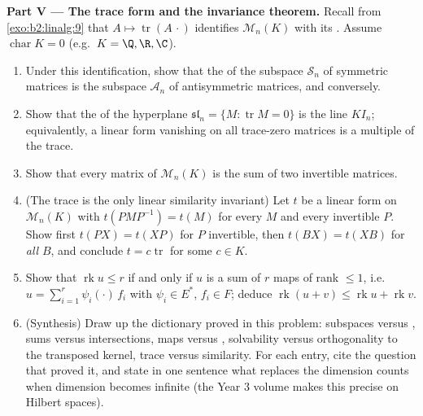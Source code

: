 \begin{problem}
\medskip
\noindent\textbf{Part V --- The trace form and the invariance
theorem.} Recall from \cref{exo:b2:linalg:9} that $A \mapsto
\operatorname{tr}(A\,\cdot)$ identifies $\mathcal{M}_n(K)$ with
its . Assume $\operatorname{char} K = 0$ (e.g.\ $K = \Q, \R,
\C$).
\begin{enumerate}[resume]
  \item Under this identification, show that the  of
        the subspace $\mathcal{S}_n$ of symmetric matrices is the
        subspace $\mathcal{A}_n$ of antisymmetric matrices, and
        conversely.
  \item Show that the  of the hyperplane
        $\mathfrak{sl}_n = \{M : \operatorname{tr} M = 0\}$ is
        the line $K I_n$; equivalently, a linear form vanishing
        on all trace-zero matrices is a multiple of the trace.
  \item Show that every matrix of $\mathcal{M}_n(K)$ is the sum
        of two invertible matrices.
  \item (The trace is the only linear similarity invariant) Let
        $t$ be a linear form on $\mathcal{M}_n(K)$ with
        $t(PMP^{-1}) = t(M)$ for every $M$ and every invertible
        $P$. Show first $t(PX) = t(XP)$ for $P$ invertible, then
        $t(BX) = t(XB)$ for \emph{all} $B$, and conclude $t = c
        \operatorname{tr}$ for some $c \in K$.
  \item Show that $\operatorname{rk} u \leq r$ if and only if $u$
        is a sum of $r$ maps of rank $\leq 1$, i.e.\ $u =
        \sum_{i=1}^{r} \psi_i(\cdot)\,f_i$ with $\psi_i \in E^*$,
        $f_i \in F$; deduce $\operatorname{rk}(u + v) \leq
        \operatorname{rk} u + \operatorname{rk} v$.
  \item (Synthesis) Draw up the dictionary proved in this
        problem: subspaces versus , sums versus
        intersections, maps versus , solvability versus
        orthogonality to the transposed kernel, trace versus
        similarity. For each entry, cite the question that proved
        it, and state in one sentence what replaces the dimension
        counts when dimension becomes infinite (the Year 3 volume
        makes this precise on Hilbert spaces).
\end{enumerate}
\end{problem}
